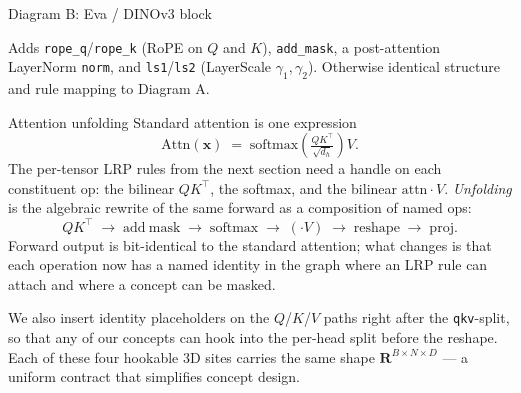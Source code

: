 \documentclass[
  aspectratio=169,
]{beamer}
\newcommand{\reals}{\mathbf{R}}
\begin{document}
\begin{frame}{Diagram B: Eva / DINOv3 block}
{%
}

\vspace{2mm}
\scriptsize Adds \texttt{rope\_q}/\texttt{rope\_k} (RoPE on $Q$ and
$K$), \texttt{add\_mask}, a post-attention LayerNorm \texttt{norm},
and \texttt{ls1}/\texttt{ls2} (LayerScale $\gamma_1, \gamma_2$).
Otherwise identical structure and rule mapping to Diagram A.
\end{frame}

\begin{frame}{Attention unfolding}
Standard attention is one expression
\[
  \mathrm{Attn}(\mathbf{x}) \;=\; \mathrm{softmax}\!\left(\tfrac{Q K^\top}{\sqrt{d_h}}\right) V .
\]
The per-tensor LRP rules from the next section need a handle on each
constituent op: the bilinear $Q K^\top$, the softmax, and the bilinear
$\mathrm{attn}\cdot V$. \emph{Unfolding} is the algebraic rewrite of
the same forward as a composition of named ops:
\[
  Q K^\top \;\to\; \mathrm{add\ mask} \;\to\; \mathrm{softmax} \;\to\; (\cdot V) \;\to\; \mathrm{reshape} \;\to\; \mathrm{proj}.
\]
Forward output is bit-identical to the standard attention; what
changes is that each operation now has a named identity in the graph
where an LRP rule can attach and where a concept can be masked.

\smallskip
We also insert identity placeholders on the $Q$/$K$/$V$ paths right
after the \texttt{qkv}-split, so that any of our concepts can hook
into the per-head split before the reshape. Each of these four
hookable 3D sites carries the same shape
$\reals^{B\times N\times D}$ — a uniform contract that simplifies
concept design.
\end{frame}
\end{document}
